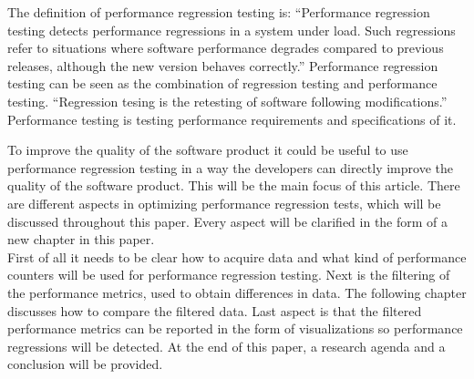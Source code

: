 The definition of performance regression testing is: ``Performance regression testing detects performance
regressions in a system under load. Such regressions refer to
situations where software performance degrades compared to
previous releases, although the new version behaves correctly.''\cite{foo2010mining}
Performance regression testing can be seen as the combination of regression testing and performance testing. ``Regression tesing is the retesting of software following modifications.''\cite{rothermel2001prioritizing} Performance testing is testing performance requirements and specifications of it.\cite{gan2006software}

To improve the quality of the software product it could be useful to use performance regression testing in a way the developers can
directly improve the quality of the software product. This will be the main focus of this article. There are different aspects in optimizing performance regression tests, which will be discussed throughout this paper. Every aspect will be clarified in the form of a new chapter in this paper. \\ First of all it needs to be clear how to acquire data and what kind of performance counters will be used for performance regression testing. Next is the filtering of the performance metrics, used to obtain differences in data. The following chapter discusses how to compare the filtered data. Last aspect is that the filtered performance metrics can be reported in the form of visualizations so performance regressions will be detected. At the end of this paper, a research agenda and a conclusion will be provided.
